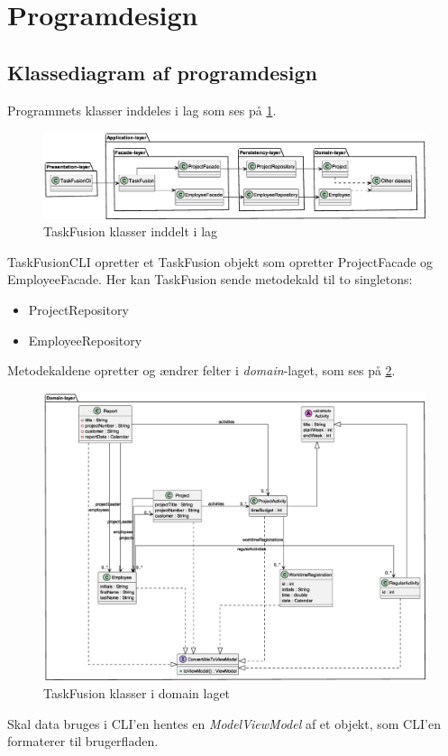 \section{Programdesign}
\subsection{Klassediagram af programdesign}
Programmets klasser inddeles i lag som ses på \cref{fig:classLayers}.
\begin{figure}
    \centering
    \caption{TaskFusion klasser inddelt i lag}\label{fig:classLayers}
    \includegraphics[width=\textwidth]{TaskFusion/out/assets/diagrams/class_persistency_layer/ClassDiagram_layer.eps}
\end{figure}
TaskFusionCLI opretter et TaskFusion objekt som opretter ProjectFacade og EmployeeFacade. Her kan TaskFusion sende metodekald til to singletons:
\begin{itemize}
    \item ProjectRepository
    \item EmployeeRepository
\end{itemize}
Metodekaldene opretter og ændrer felter i \textit{domain}-laget, som ses på \cref{fig:domainLayer}.
\begin{figure}
    \centering
    \caption{TaskFusion klasser i domain laget}\label{fig:domainLayer}
    \includegraphics[width=\textwidth]{TaskFusion/out/assets/diagrams/class_persistency_domain/ClassDiagram_domain.eps}
\end{figure}
Skal data bruges i CLI'en hentes en \textit{ModelViewModel} af et objekt, som CLI'en formaterer til brugerfladen.
\newpage
